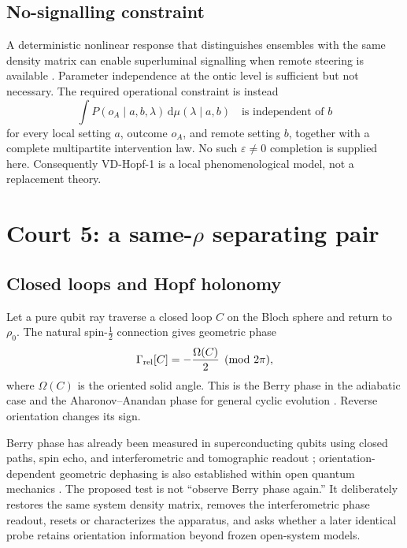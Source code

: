 \documentclass[10pt]{article}
\theoremstyle{definition}
\theoremstyle{remark}
\newcommand{\dd}{\mathrm d}
\begin{document}
\subsection{No-signalling constraint}
\label{sec:no-signalling}

A deterministic nonlinear response that distinguishes ensembles with the same density matrix can enable superluminal signalling when remote steering is available \citep{Gisin1990,Polchinski1991}. Parameter independence at the ontic level is sufficient but not necessary. The required operational constraint is instead
\begin{equation}
  \int P(o_A\mid a,b,\lambda)\,
  \dd\mu(\lambda\mid a,b)
  \quad\text{is independent of }b
  \label{eq:operational-no-signalling}
\end{equation}
for every local setting \(a\), outcome \(o_A\), and remote setting \(b\), together with a complete multipartite intervention law. No such \(\varepsilon\neq0\) completion is supplied here. Consequently VD-Hopf-1 is a local phenomenological model, not a replacement theory.

\section{Court 5: a same-\texorpdfstring{\(\rho\)}{rho} separating pair}

\subsection{Closed loops and Hopf holonomy}

Let a pure qubit ray traverse a closed loop \(C\) on the Bloch sphere and return to \(\rho_0\). The natural spin-\(\tfrac12\) connection gives geometric phase
\begin{equation}
  \Gamma_{\rm rel}[C]=-\frac{\Omega(C)}2\pmod{2\pi},
  \label{eq:berry}
\end{equation}
where \(\Omega(C)\) is the oriented solid angle. This is the Berry phase in the adiabatic case and the Aharonov--Anandan phase for general cyclic evolution \citep{Berry1984,AharonovAnandan1987}. Reverse orientation changes its sign.

Berry phase has already been measured in superconducting qubits using closed paths, spin echo, and interferometric and tomographic readout \citep{Leek2007}; orientation-dependent geometric dephasing is also established within open quantum mechanics \citep{Berger2015}. The proposed test is not ``observe Berry phase again.'' It deliberately restores the same system density matrix, removes the interferometric phase readout, resets or characterizes the apparatus, and asks whether a later identical probe retains orientation information beyond frozen open-system models.
\end{document}
